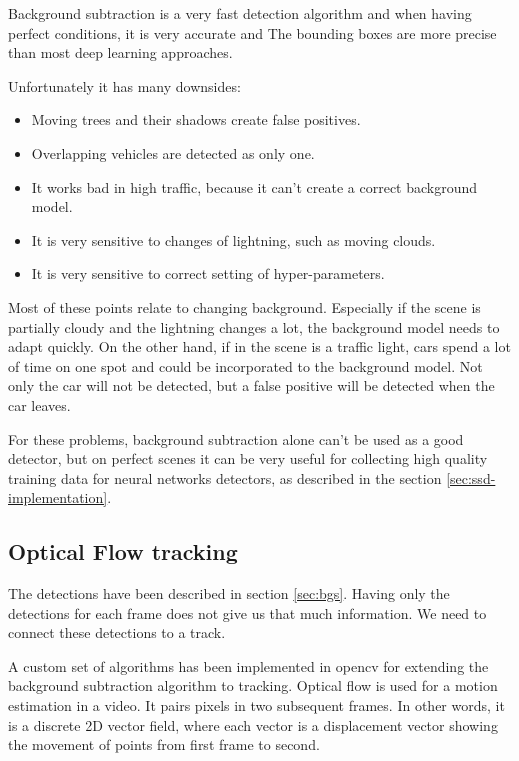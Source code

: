 \documentclass[a4paper,12pt,titlepage, twoside]{article}
\numberwithin{figure}{section}
\begin{document}
Background subtraction is a very fast detection algorithm and when having perfect conditions, it is very accurate and The bounding boxes are more precise than most deep learning approaches.

Unfortunately it has many downsides:

\begin{itemize}
\item Moving trees and their shadows create false positives.
\item Overlapping vehicles are detected as only one.
\item It works bad in high traffic, because it can't create a correct background model.
\item It is very sensitive to changes of lightning, such as moving clouds.
\item It is very sensitive to correct setting of hyper-parameters.
\end{itemize}

Most of these points relate to changing background. Especially if the scene is partially cloudy and the lightning changes a lot, the background model needs to adapt quickly. On the other hand, if in the scene is a traffic light, cars spend a lot of time on one spot and could be incorporated to the background model. Not only the car will not be detected, but a false positive will be detected when the car leaves.

For these problems, background subtraction alone can't be used as a good detector, but on perfect scenes  it can be very useful for collecting high quality training data for neural networks detectors, as described in the section \ref{sec:ssd-implementation}.

\subsection{Optical Flow tracking}
\label{sec:optical-flow}
The detections have been described in section \ref{sec:bgs}. Having only the detections for each frame does not give us that much information. We need to connect these detections to a track.

A custom set of algorithms has been implemented in opencv\cite{opencv} for extending the background subtraction algorithm to tracking. Optical flow \cite{optical-flow} is used for a motion estimation in a video. It pairs pixels in two subsequent frames. In other words, it is a discrete 2D vector field, where each vector is a displacement vector showing the movement of points from first frame to second.
\end{document}

